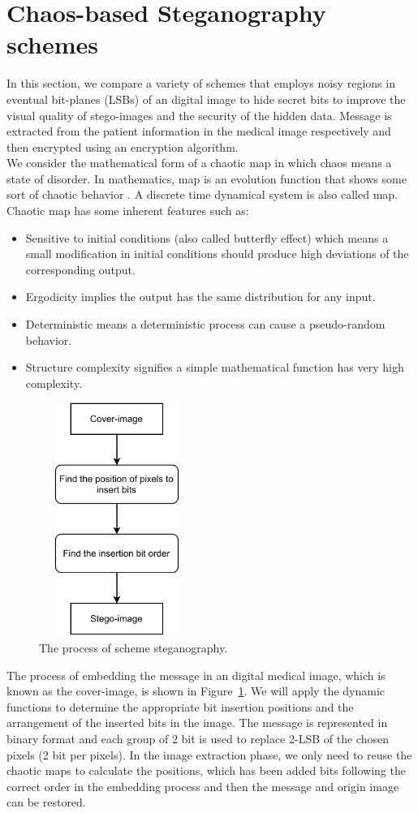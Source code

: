 \documentclass[conference]{IEEEtran}
\begin{document}
\section{Chaos-based Steganography schemes}
In this section, we compare a variety of schemes that employs noisy regions in eventual bit-planes (LSBs) of an digital image to hide secret bits to improve the visual quality of stego-images and the security of the hidden data. Message is extracted from the patient information in the medical image respectively and then encrypted using an encryption algorithm. \\[0.2cm]
\indent We consider the mathematical form of a chaotic map in which chaos means a state of disorder. In mathematics, map is an evolution function that shows some sort of chaotic behavior \cite{b4}. A discrete time dynamical system is also called map. Chaotic map has some inherent features \cite{b5} such as:
\begin{itemize}
	\item Sensitive to initial conditions (also called butterfly effect) which means a small modification in initial conditions should produce high deviations of the corresponding output.
	\item Ergodicity implies the output has the	same distribution for any input.
	\item Deterministic means a deterministic process can cause a pseudo-random behavior.
	\item Structure complexity signifies a simple mathematical function has very high complexity.
\end{itemize}
\begin{figure}[h!]
	\centering
	\includegraphics[width=2in,height=3in]{./process}
	\caption{The process of scheme steganography.}\label{fig:process}
\end{figure}
The process of embedding the message in an digital medical image, which is known as the cover-image, is shown in Figure~\ref{fig:process}. We will apply the dynamic functions to determine the appropriate bit insertion positions and the arrangement of the inserted bits in the image. The message is represented in binary format and each group of 2 bit is used to replace 2-LSB of the chosen pixels (2 bit per pixels). In the image extraction phase, we only need to reuse the chaotic maps to calculate the positions, which has been added bits following the correct order in the embedding process and then the message and origin image can be restored.
\end{document}
